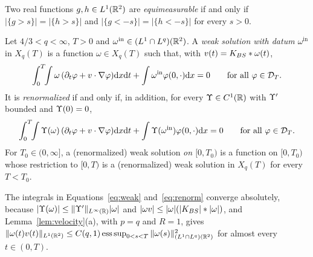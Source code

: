 \begin{definition}
\label{def:equimeasurable}
Two real functions $g,h\in L^1(\mathbb{R}^2)$ are \textit{equimeasurable} if and only if
$|\{g>s\}|=|\{h>s\}|$ and $|\{g<-s\}|=|\{h<-s\}|$ for every $s>0$.
\end{definition}

\begin{definition}
\label{def:weak}
Let $4/3<q<\infty$, $T>0$ and $\omega^{\mathrm{in}}\in (L^1\cap L^q)(\mathbb{R}^2)$. A
\textit{weak solution with datum $\omega^{\mathrm{in}}$} in $X_q(T)$ is a function
$\omega\in X_q(T)$ such that, with $v(t)=K_{BS}\ast\omega(t)$,
\begin{equation}
\label{eq:weak}
\int_0^T\!\!\int\omega\,(\partial_t\varphi+v\cdot\nabla\varphi)\dd x\dd t
+\int\omega^{\mathrm{in}}\varphi(0,\cdot)\dd x=0
\qquad\text{for all }\varphi\in\mathcal{D}_T .
\end{equation}
It is \textit{renormalized} if and only if, in addition, for every
$\Upsilon\in C^1(\mathbb{R})$ with $\Upsilon'$ bounded and $\Upsilon(0)=0$,
\begin{equation}
\label{eq:renorm}
\int_0^T\!\!\int\Upsilon(\omega)\,(\partial_t\varphi+v\cdot\nabla\varphi)\dd x\dd t
+\int\Upsilon(\omega^{\mathrm{in}})\varphi(0,\cdot)\dd x=0
\qquad\text{for all }\varphi\in\mathcal{D}_T .
\end{equation}
For $T_0\in(0,\infty]$, a (renormalized) weak solution \textit{on $[0,T_0)$} is a
function on $[0,T_0)$ whose restriction to $[0,T)$ is a (renormalized) weak
solution in $X_q(T)$ for every $T<T_0$.
\end{definition}

The integrals in Equations~\eqref{eq:weak} and~\eqref{eq:renorm} converge
absolutely, because $|\Upsilon(\omega)|\le\|\Upsilon'\|_{L^\infty(\mathbb{R})}|\omega|$ and
$|\omega v|\le|\omega|(|K_{BS}|\ast|\omega|)$, and Lemma~\ref{lem:velocity}(a),
with $p=q$ and $R=1$, gives
$\|\omega(t)v(t)\|_{L^1(\mathbb{R}^2)}\le C(q,1)\operatorname{ess\,sup}_{0<s<T}\|\omega(s)\|_{(L^1\cap L^q)(\mathbb{R}^2)}^2$
for almost every $t\in(0,T)$.
